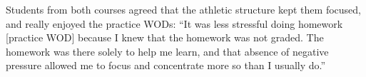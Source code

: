 Students from both courses agreed that the athletic structure kept them focused, and really enjoyed the practice WODs:
``It was less stressful doing homework [practice WOD] because I knew that the homework was not graded. The homework was there solely to help me learn, and that absence of negative pressure allowed me to focus and concentrate more so than I usually do.''

